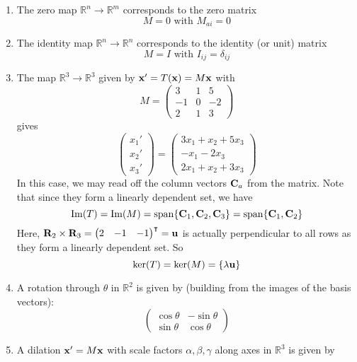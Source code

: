 \begin{example}
\begin{enumerate}
	\item The zero map \(\mathbb R^n \to \mathbb R^m\) corresponds to the zero matrix
	      \[
		      M = 0 \text{ with } M_{ai} = 0
	      \]
	\item The identity map \(\mathbb R^n \to \mathbb R^n\) corresponds to the identity (or unit) matrix
	      \[
		      M = I \text{ with } I_{ij} = \delta_{ij}
	      \]
	\item The map \(\mathbb R^3 \to \mathbb R^3\) given by \(\vb x' = T(\vb x) = M\vb x\) with
	      \[
		      M = \begin{pmatrix}
			      3  & 1 & 5  \\
			      -1 & 0 & -2 \\
			      2  & 1 & 3
		      \end{pmatrix}
	      \]
	      gives
	      \[
		      \begin{pmatrix}
			      x_1' \\ x_2' \\ x_3'
		      \end{pmatrix}
		      =
		      \begin{pmatrix}
			      3x_1 + x_2 + 5x_3 \\
			      -x_1 - 2x_3       \\
			      2x_1 + x_2 + 3x_3
		      \end{pmatrix}
	      \]
	      In this case, we may read off the column vectors \(\vb C_a\) from the matrix.
	      Note that since they form a linearly dependent set, we have
	      \[
		      \operatorname{Im}(T) = \operatorname{Im}(M) = \operatorname{span} \{ \vb C_1, \vb C_2, \vb C_3 \} = \operatorname{span} \{ \vb C_1, \vb C_2 \}
	      \]
	      Here, \(\vb R_2 \times \vb R_3 = \begin{pmatrix}
		      2 & -1 & -1
	      \end{pmatrix}^\intercal = \vb u\) is actually perpendicular to all rows as they form a linearly dependent set.
	      So
	      \[
		      \ker(T) = \ker(M) = \{ \lambda \vb u \}
	      \]
	\item A rotation through \(\theta\) in \(\mathbb R^2\) is given by (building from the images of the basis vectors):
	      \[
		      \begin{pmatrix}
			      \cos \theta & -\sin \theta \\
			      \sin \theta & \cos \theta
		      \end{pmatrix}
	      \]
	\item A dilation \(\vb x' = M \vb x\) with scale factors \(\alpha, \beta, \gamma\) along axes in \(\mathbb R^3\) is given by

\end{enumerate}
\end{example}
